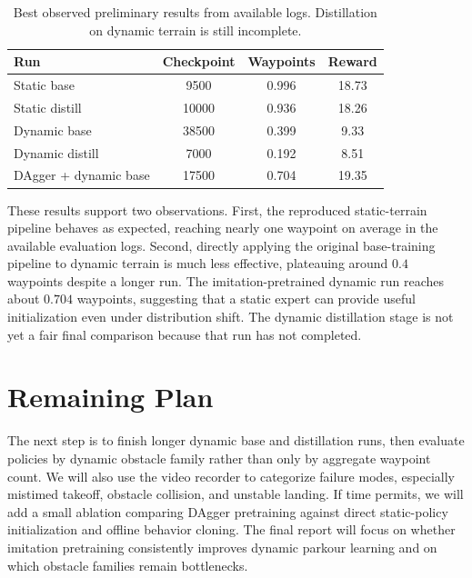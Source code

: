 \documentclass[conference]{IEEEtran}
\begin{document}
\begin{table}[t]
   \centering
   \caption{Best observed preliminary results from available logs. Distillation on dynamic terrain is still incomplete.}
   \label{tab:results}
   \begin{tabular}{lccc}
      \toprule
      Run                   & Checkpoint & Waypoints & Reward \\
      \midrule
      Static base           & 9500       & 0.996     & 18.73  \\
      Static distill        & 10000      & 0.936     & 18.26  \\
      Dynamic base          & 38500      & 0.399     & 9.33   \\
      Dynamic distill       & 7000       & 0.192     & 8.51   \\
      DAgger + dynamic base & 17500      & 0.704     & 19.35  \\
      \bottomrule
   \end{tabular}
\end{table}

These results support two observations. First, the reproduced static-terrain pipeline behaves as expected, reaching nearly one waypoint on average in the available evaluation logs. Second, directly applying the original base-training pipeline to dynamic terrain is much less effective, plateauing around $0.4$ waypoints despite a longer run. The imitation-pretrained dynamic run reaches about $0.704$ waypoints, suggesting that a static expert can provide useful initialization even under distribution shift. The dynamic distillation stage is not yet a fair final comparison because that run has not completed.

\section{Remaining Plan}
The next step is to finish longer dynamic base and distillation runs, then evaluate policies by dynamic obstacle family rather than only by aggregate waypoint count. We will also use the video recorder to categorize failure modes, especially mistimed takeoff, obstacle collision, and unstable landing. If time permits, we will add a small ablation comparing DAgger pretraining against direct static-policy initialization and offline behavior cloning. The final report will focus on whether imitation pretraining consistently improves dynamic parkour learning and on which obstacle families remain bottlenecks.



\end{document}
